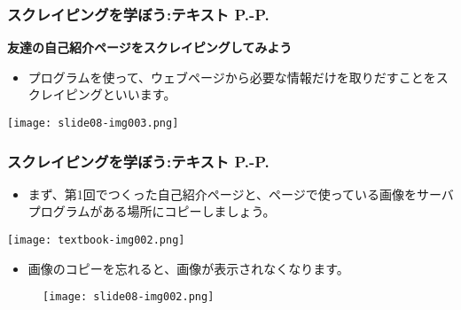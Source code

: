 \begin{frame}[fragile]
	\frametitle{スクレイピングを学ぼう:テキスト P.\pageref{1:P:intro}-P.\pageref{1:P:charCode}~~~}
  \large\textbf{友達の自己紹介ページをスクレイピングしてみよう}
        \begin{itemize}
            \item プログラムを使って、ウェブページから必要な情報だけを取りだすことをスクレイピングといいます。
        \end{itemize}
        \begin{minipage}{\textwidth}
            {\upshape
              \texttt{[image: slide08-img003.png]}}
        \end{minipage}
\end{frame}

\begin{frame}[fragile]
	\frametitle{スクレイピングを学ぼう:テキスト P.\pageref{1:P:intro}-P.\pageref{1:P:charCode}~~~}
        \begin{itemize}
            \item まず、第1回でつくった自己紹介ページと、ページで使っている画像をサーバプログラムがある場所にコピーしましょう。
        \end{itemize}
        \begin{minipage}{\textwidth}
            {\upshape
              \texttt{[image: textbook-img002.png]}}
        \end{minipage}
        \begin{itemize}
            \item 画像のコピーを忘れると、画像が表示されなくなります。
        \end{itemize}
        \begin{figure}
          \centering
          \texttt{[image: slide08-img002.png]}
        \end{figure}
\end{frame}

